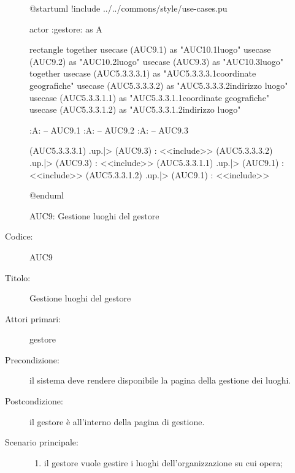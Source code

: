 \documentclass[../../../analisi-dei-requisiti.tex]{subfiles}
\begin{document}
\begin{figure}[H]
  \centering
  \begin{plantuml}
  @startuml
  !include ../../commons/style/use-cases.pu

  actor :gestore: as A

  rectangle {
    together {
      usecase (AUC9.1) as "AUC10.1\nAggiunta luogo"
      usecase (AUC9.2) as "AUC10.2\nRimozione luogo"
      usecase (AUC9.3) as "AUC10.3\nModifica luogo"
    }
    together {
      usecase (AUC5.3.3.3.1) as "AUC5.3.3.3.1\nModifica coordinate geografiche"
      usecase (AUC5.3.3.3.2) as "AUC5.3.3.3.2\nModifica indirizzo luogo"
      usecase (AUC5.3.3.1.1) as "AUC5.3.3.1.1\nInserisci coordinate geografiche"
      usecase (AUC5.3.3.1.2) as "AUC5.3.3.1.2\nInserisci indirizzo luogo"
    }
  }

  :A: -- AUC9.1
  :A: -- AUC9.2
  :A: -- AUC9.3

  (AUC5.3.3.3.1) .up.|> (AUC9.3) : <<include>>
  (AUC5.3.3.3.2) .up.|> (AUC9.3) : <<include>>
  (AUC5.3.3.1.1) .up.|> (AUC9.1) : <<include>>
  (AUC5.3.3.1.2) .up.|> (AUC9.1) : <<include>>

  @enduml
  \end{plantuml}
  \caption{AUC9: Gestione luoghi del gestore}
  \label{fig:AUC9}
\end{figure}

\begin{description}
  \item[Codice:] AUC9
  \item[Titolo:] Gestione luoghi del gestore
  \item[Attori primari:] gestore
  \item[Precondizione:] il sistema deve rendere disponibile la pagina della gestione dei luoghi.
  \item[Postcondizione:] il gestore è all'interno della pagina di gestione.
  \item[Scenario principale:]
  \begin{enumerate}
    \item il gestore vuole gestire i luoghi dell'organizzazione su cui opera;
  \end{enumerate}
\end{description}
\end{document}
